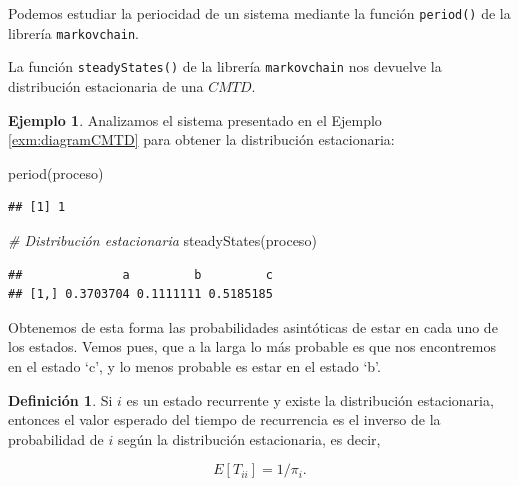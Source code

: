 \documentclass[
]{book}
\newenvironment{Shaded}{\begin{snugshade}}{\end{snugshade}}
\newcommand{\CommentTok}[1]{\textcolor[rgb]{0.56,0.35,0.01}{\textit{#1}}}
\newcommand{\FunctionTok}[1]{\textcolor[rgb]{0.00,0.00,0.00}{#1}}
\newcommand{\NormalTok}[1]{#1}
\newenvironment{yellowbox}{
  \definecolor{shadecolor}{rgb}{210, 180, 140}  
  \color{black}
  \begin{shaded}}
 {\end{shaded}}
\newenvironment{whitebox}{
  \definecolor{shadecolor}{rgb}{255, 255, 255}  
  \color{black}
  \begin{shaded}}
 {\end{shaded}}
\theoremstyle{definition}
\newtheorem{definition}{Definición}[chapter]
\theoremstyle{definition}
\newtheorem{example}{Ejemplo}[chapter]
\theoremstyle{definition}
\theoremstyle{definition}
\theoremstyle{remark}
\begin{document}
\begin{whitebox}
Podemos estudiar la periocidad de un sistema mediante la función \texttt{period()} de la librería \texttt{markovchain}.

La función \texttt{steadyStates()} de la librería \texttt{markovchain} nos devuelve la distribución estacionaria de una \(CMTD\).

\end{whitebox}

\begin{example}
Analizamos el sistema presentado en el Ejemplo \ref{exm:diagramCMTD} para obtener la distribución estacionaria:

\begin{Shaded}
\begin{Highlighting}[]
\FunctionTok{period}\NormalTok{(proceso)}
\end{Highlighting}
\end{Shaded}

\begin{verbatim}
## [1] 1
\end{verbatim}

\begin{Shaded}
\begin{Highlighting}[]
\CommentTok{\# Distribución estacionaria}
\FunctionTok{steadyStates}\NormalTok{(proceso)}
\end{Highlighting}
\end{Shaded}

\begin{verbatim}
##              a         b         c
## [1,] 0.3703704 0.1111111 0.5185185
\end{verbatim}

Obtenemos de esta forma las probabilidades asintóticas de estar en cada uno de los estados. Vemos pues, que a la larga lo más probable es que nos encontremos en el estado `c', y lo menos probable es estar en el estado `b'.
\end{example}

\begin{yellowbox}

\begin{definition}

Si \(i\) es un estado recurrente y existe la distribución estacionaria, entonces el valor esperado del tiempo de recurrencia es el inverso de la probabilidad de \(i\) según la distribución estacionaria, es decir,

\begin{equation}
E[T_{ii}] = 1/\pi_i.
\label{eq:et-piestacionaria}
\end{equation}

\end{definition}

\end{yellowbox}
\end{document}
